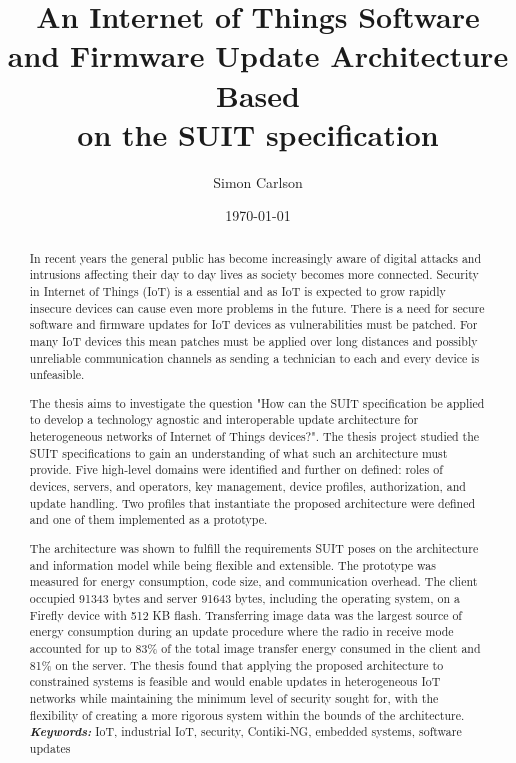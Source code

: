 \documentclass{kththesis}
\title{An Internet of Things Software and Firmware Update Architecture Based\\on the SUIT specification}
\author{Simon Carlson}
\date{\today}
\providecommand{\keywords}[1]{\textbf{\textit{Keywords:}} #1}
\begin{document}
\frontmatter

\titlepage

\begin{abstract}
In recent years the general public has become increasingly aware of digital attacks and
intrusions affecting their day to day lives as society becomes more connected. Security in
Internet of Things (IoT) is a essential and as IoT is expected to grow rapidly insecure
devices can cause even more problems in the future. There is a need for secure software
and firmware updates for IoT devices as vulnerabilities must be patched. For many IoT
devices this mean patches must be applied over long distances and possibly unreliable
communication channels as sending a technician to each and every device is unfeasible. 

The thesis aims to investigate the question "How can the SUIT specification be applied to
develop a technology agnostic and interoperable update architecture for heterogeneous
networks of Internet of Things devices?". The thesis project studied the SUIT
specifications to gain an understanding of what such an architecture must provide. Five
high-level domains were identified and further on defined: roles of devices, servers, and
operators, key management, device profiles, authorization, and update handling. Two
profiles that instantiate the proposed architecture were defined and one of them
implemented as a prototype. 

The architecture was shown to fulfill the requirements SUIT poses on the architecture and
information model while being flexible and extensible. The prototype was measured for
energy consumption, code size, and communication overhead. The client occupied 91343 bytes
and server 91643 bytes, including the operating system, on a Firefly device with 512 KB
flash. Transferring image data was the largest source of energy consumption during an
update procedure where the radio in receive mode accounted for up to 83\% of the total
image transfer energy consumed in the client and 81\% on the server. The thesis found that
applying the proposed architecture to constrained systems is feasible and would enable
updates in heterogeneous IoT networks while maintaining the minimum level of security
sought for, with the flexibility of creating a more rigorous system within the bounds of
the architecture.\\

\noindent\keywords{IoT, industrial IoT, security, Contiki-NG, embedded systems, 
                    software updates}
\end{abstract}
\end{document}
